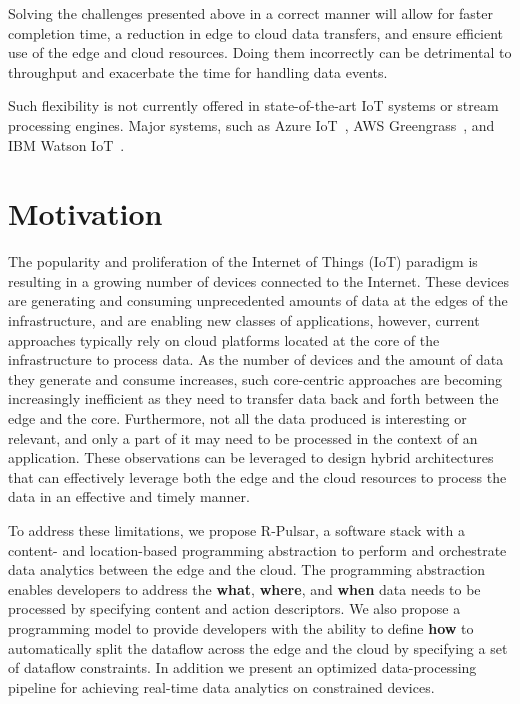 Solving the challenges presented above in a correct manner will allow for faster completion time, a reduction in edge to cloud data transfers, and ensure efficient use of the edge and cloud resources. Doing them incorrectly can be detrimental to throughput and exacerbate the time for handling data events.
 
Such flexibility is not currently offered in state-of-the-art IoT systems or stream processing engines. Major systems, such as Azure IoT~\cite{azure}, AWS Greengrass~\cite{amazon}, and IBM Watson IoT~\cite{IBM}.

\section{Motivation}

The popularity and proliferation of the Internet of Things (IoT) paradigm is resulting in a growing number of devices connected to the Internet. These devices are generating and consuming unprecedented amounts of data at the edges of the infrastructure, and are enabling new classes of applications, however, current approaches typically rely on cloud
platforms located at the core of the infrastructure to process data. As the number of devices and the amount of data they generate and consume increases, such core-centric approaches are becoming increasingly inefficient as they need to transfer data back and forth between the edge and the core. Furthermore, not all the data produced is interesting or relevant, and only a part of it may need to be processed in the context of an application. These observations can be leveraged to design hybrid architectures that can effectively leverage both the edge and the cloud resources to process the data in an effective and timely manner\cite{ahmed2017role, satyanarayanan2015edge}.

To address these limitations, we propose R-Pulsar, a software stack with a content- and location-based programming abstraction to perform and orchestrate data analytics between the edge and the cloud. The programming abstraction enables developers to address the \textbf{what}, \textbf{where}, and \textbf{when} data needs to be processed by specifying content and action descriptors. We also propose a programming model to provide developers with the ability to define \textbf{how} to automatically split the dataflow across the edge and the cloud by specifying a set of dataflow constraints. In addition we present an optimized data-processing pipeline for achieving real-time data analytics on constrained devices.

